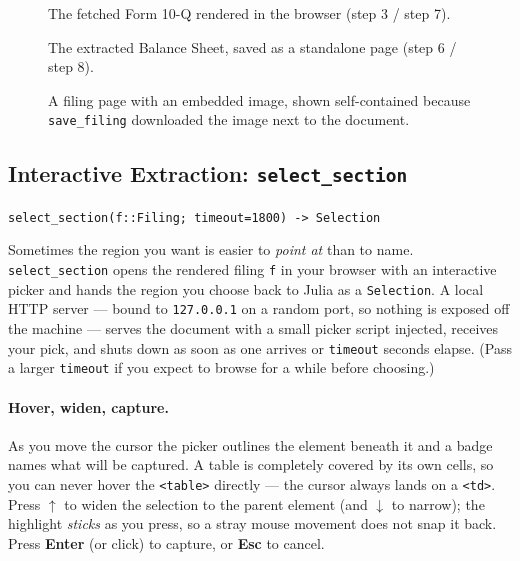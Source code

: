 \documentclass[11pt,a4paper]{report}
\newcommand{\sig}[1]{\medskip\noindent\texttt{#1}\par\medskip}
\begin{document}
\begin{figure}[h]
\centering
{}
\caption{The fetched Form 10-Q rendered in the browser (step 3 / step 7).}
\label{fig:lc-10q}
\end{figure}

\begin{figure}[h]
\centering
{}
\caption{The extracted Balance Sheet, saved as a standalone page (step 6 / step 8).}
\label{fig:lc-bs}
\end{figure}

\begin{figure}[h]
\centering
{}
\caption{A filing page with an embedded image, shown self-contained because
\texttt{save\_filing} downloaded the image next to the document.}
\label{fig:lc-image}
\end{figure}


\newcommand{\swatch}[1]{\textcolor{#1}{\rule{1.4ex}{1.4ex}}}
\newcommand{\htmltag}[1]{\texttt{\textless #1\textgreater}}

\subsection{Interactive Extraction: \texttt{select\_section}}
\label{sec:select-section}

\sig{select\_section(f::Filing; timeout=1800) -> Selection}

\noindent Sometimes the region you want is easier to \emph{point at} than to name.
\texttt{select\_section} opens the rendered filing \texttt{f} in your browser with an
interactive picker and hands the region you choose back to Julia as a
\texttt{Selection}. A local HTTP server --- bound to \texttt{127.0.0.1} on a random
port, so nothing is exposed off the machine --- serves the document with a small
picker script injected, receives your pick, and shuts down as soon as one arrives or
\texttt{timeout} seconds elapse. (Pass a larger \texttt{timeout} if you expect to
browse for a while before choosing.)

\paragraph{Hover, widen, capture.} As you move the cursor the picker outlines the
element beneath it and a badge names what will be captured. A table is completely
covered by its own cells, so you can never hover the \htmltag{table} directly --- the
cursor always lands on a \htmltag{td}. Press \textbf{$\uparrow$} to widen the
selection to the parent element (and \textbf{$\downarrow$} to narrow); the highlight
\emph{sticks} as you press, so a stray mouse movement does not snap it back. Press
\textbf{Enter} (or click) to capture, or \textbf{Esc} to cancel.
\end{document}
